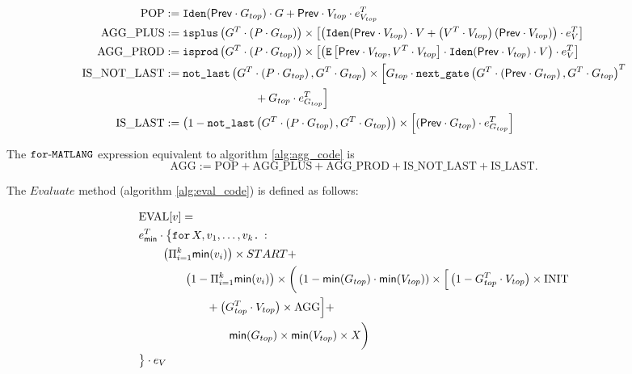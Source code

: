    \begin{align*}
        \text{POP} &:= \texttt{Iden}(\mathsf{Prev}\cdot G_{top})\cdot G + \mathsf{Prev}\cdot V_{top}\cdot e_{V_{top}}^T  \\
        \text{AGG{\_}PLUS} &:= \texttt{isplus}\left( G^T \cdot \left( P \cdot G_{top}\right) \right) \times \left[ \left( \texttt{Iden}(\mathsf{Prev}\cdot V_{top}) \cdot V + \left( V^T \cdot V_{top} \right)\left( \mathsf{Prev}\cdot V_{top} \right)\right) \cdot e_{V}^T \right] \\
        \text{AGG{\_}PROD} &:= \texttt{isprod}\left(G^T \cdot \left( P \cdot G_{top}\right) \right) \times \left[ \left( \texttt{E}\left[ \mathsf{Prev}\cdot V_{top}, V^T \cdot V_{top} \right] \cdot \texttt{Iden}(\mathsf{Prev}\cdot V_{top}) \cdot V \right) \cdot e_{V}^T \right] \\
        \text{IS{\_}NOT{\_}LAST} &:= \texttt{not{\_}last}\left(G^T \cdot \left( P \cdot G_{top}\right),G^T \cdot G_{top} \right) \times \Big[  G_{top} \cdot \texttt{next{\_}gate}\left(G^T \cdot \left( \mathsf{Prev}\cdot G_{top} \right) , G^T \cdot G_{top} \right)^T \\
        &\hspace{8em}+ G_{top}\cdot e_{G_{top}}^T \Big] \\
        \text{IS{\_}LAST} &:= \left( 1 - \texttt{not{\_}last}\left(G^T \cdot \left( P \cdot G_{top}\right),G^T \cdot G_{top} \right) \right)\times \left[ \left( \mathsf{Prev}\cdot G_{top} \right) \cdot e_{G_{top}}^T \right]
    \end{align*}

    The $\texttt{for}\text{-}\texttt{MATLANG}$ expression equivalent to algorithm \ref{alg:agg_code} is $$\text{AGG}:=\text{POP} + \text{AGG{\_}PLUS}+\text{AGG{\_}PROD}+\text{IS{\_}NOT{\_}LAST}+\text{IS{\_}LAST}.$$

    The $Evaluate$ method (algorithm \ref{alg:eval_code}) is defined as follows:

    \begin{align*}
        &\text{EVAL}[v]= \\
        &e_{\mathsf{min}}^T \cdot \big\lbrace \texttt{for}\, X,v_1, \ldots, v_k \texttt{.}\, : \\
        &\hspace{2em}\left( \Pi_{i=1}^k \mathsf{min}(v_i)\right) \times START + \\
        &\hspace{4em}\left( 1- \Pi_{i=1}^k \mathsf{min}(v_i)\right) \times \bigg( \left(1 - \mathsf{min}(G_{top})\cdot \mathsf{min}(V_{top}) \right) \times \Big[ \left( 1 - G_{top}^T\cdot V_{top} \right) \times \text{INIT} \\
        &\hspace{6em}+ \left(  G_{top}^T\cdot V_{top} \right) \times \text{AGG} \Big] + \\
        &\hspace{8em}\mathsf{min}(G_{top})\times \mathsf{min}(V_{top})\times X\bigg) \\ 
        &\big\rbrace\cdot e_{V}
    \end{align*}

